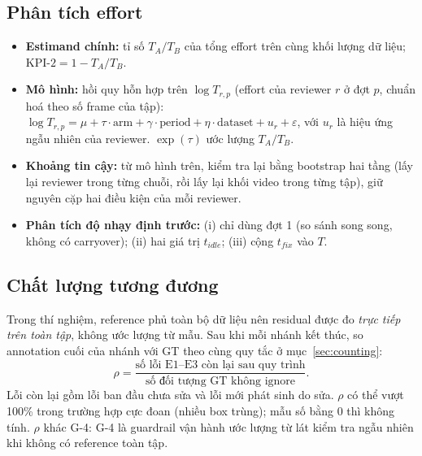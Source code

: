 \subsection{Phân tích effort}
\begin{itemize}
  \item \textbf{Estimand chính:} tỉ số \(T_A/T_B\) của tổng effort trên cùng khối
        lượng dữ liệu; \(\text{KPI-2} = 1 - T_A/T_B\).
  \item \textbf{Mô hình:} hồi quy hỗn hợp trên \(\log T_{r,p}\) (effort của
        reviewer \(r\) ở đợt \(p\), chuẩn hoá theo số frame của tập):
        \(\log T_{r,p} = \mu + \tau\cdot\mathrm{arm} + \gamma\cdot\mathrm{period}
        + \eta\cdot\mathrm{dataset} + u_r + \varepsilon\), với \(u_r\) là hiệu ứng
        ngẫu nhiên của reviewer. \(\exp(\tau)\) ước lượng \(T_A/T_B\).
  \item \textbf{Khoảng tin cậy:} từ mô hình trên, kiểm tra lại bằng bootstrap hai
        tầng (lấy lại reviewer trong từng chuỗi, rồi lấy lại khối video trong
        từng tập), giữ nguyên cặp hai điều kiện của mỗi reviewer.
  \item \textbf{Phân tích độ nhạy định trước:} (i) chỉ dùng đợt 1 (so sánh song
        song, không có carryover); (ii) hai giá trị \(t_{idle}\); (iii) cộng
        \(t_{fix}\) vào \(T\).
\end{itemize}

\subsection{Chất lượng tương đương}
Trong thí nghiệm, reference phủ toàn bộ dữ liệu nên residual được đo \emph{trực
tiếp trên toàn tập}, không ước lượng từ mẫu. Sau khi mỗi nhánh kết thúc, so
annotation cuối của nhánh với GT theo cùng quy tắc ở mục~\ref{sec:counting}:
\[
  \rho = \frac{\text{số lỗi E1–E3 còn lại sau quy trình}}{\text{số đối tượng GT không ignore}} .
\]
Lỗi còn lại gồm lỗi ban đầu chưa sửa và lỗi mới phát sinh do sửa. \(\rho\) có thể
vượt 100\% trong trường hợp cực đoan (nhiều box trùng); mẫu số bằng 0 thì không
tính. \(\rho\) khác G-4: G-4 là guardrail vận hành ước lượng từ lát kiểm tra
ngẫu nhiên khi không có reference toàn tập.

